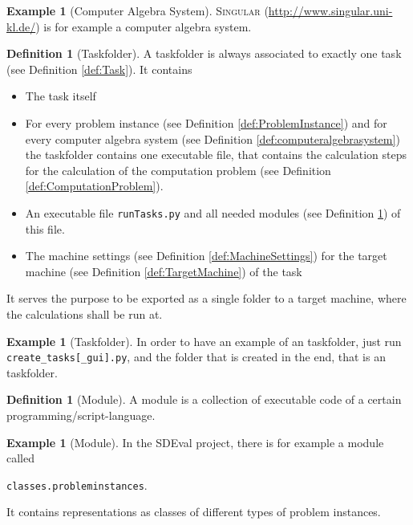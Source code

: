 \documentclass[11pt,a4paper]{amsart}
\numberwithin{equation}{section}
\theoremstyle{definition}
\newtheorem{definition}[theorem]{Definition}
\newtheorem{example}[theorem]{Example}
\begin{document}
\begin{example}[Computer Algebra System]
  \textsc{Singular} (\url{http://www.singular.uni-kl.de/}) is for example a computer algebra system.
\end{example}

\begin{definition}[Taskfolder]
  \label{def:TaskFolder}
  A taskfolder is always associated to exactly one task (see
  Definition \ref{def:Task}). It contains
  \begin{itemize}
    \item The task itself
    \item For every problem instance (see Definition \ref{def:ProblemInstance}) and for every computer algebra
      system (see Definition \ref{def:computeralgebrasystem}) the taskfolder contains one executable file, that
      contains the calculation steps for the calculation of the
      computation problem (see Definition
      \ref{def:ComputationProblem}).
    \item An executable file \texttt{runTasks.py} and all needed
      modules (see Definition \ref{def:module}) of this file.
    \item The machine settings (see Definition
      \ref{def:MachineSettings}) for the target machine (see
      Definition \ref{def:TargetMachine}) of the task
  \end{itemize}
  It serves the purpose to be exported as a single folder to a target
  machine, where the calculations shall be run at.
\end{definition}

\begin{example}[Taskfolder]
  In order to have an example of an taskfolder, just run
  \texttt{create\_tasks[\_gui].py}, and the folder that is created in
  the end, that is an taskfolder.
\end{example}

\begin{definition}[Module]
  \label{def:module}
  A module is a collection of executable code of a certain programming/script-language.
\end{definition}

\begin{example}[Module]
  In the SDEval project, there is for example a module called

  \texttt{classes.probleminstances}.

It contains representations as
  classes of different types of problem instances.
\end{example}
\end{document}

